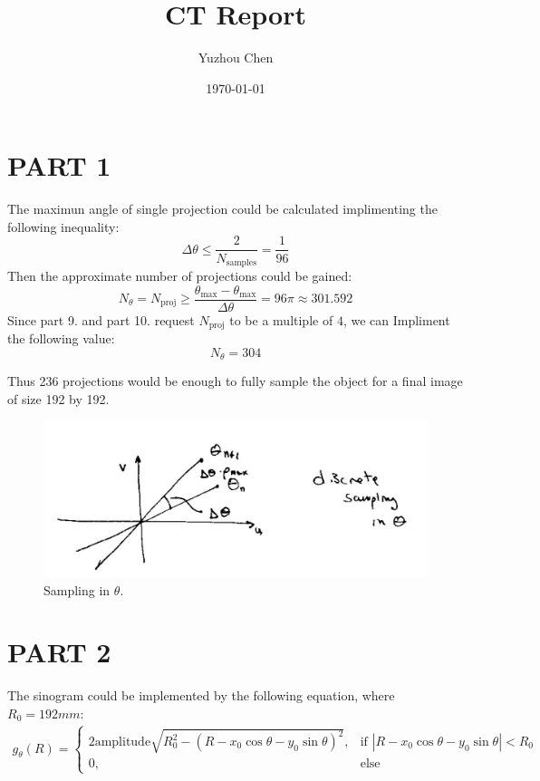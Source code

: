 \documentclass{report}
\title{CT Report}
\author{Yuzhou Chen}
\date{\today}
\begin{document}
\maketitle
\section[short]{PART 1}

The maximun angle of single projection could be calculated implimenting the following inequality:
\[
    \Delta \theta \leq \frac{2}{N_{\text{samples}}} = \frac{1}{96}
\]
Then the approximate number of projections could be gained: 
\[
    N_\theta = N_{\text{proj}} \geq \frac{\theta_{\text{max}}-\theta_{\text{max}}}{\Delta \theta} = 96 \pi \approx 301.592
\]
Since part 9. and part 10. request $ N_{\text{proj}}$ to be a multiple of $4$, we can Impliment the following value:
\[
    N_\theta = 304
\]

Thus 236 projections would be enough to fully sample the object for a final
image of size 192 by 192.
\begin{figure}[hb]
    \centering
    \includegraphics[width=1\textwidth]{1.png}
    \caption{Sampling in $\theta$.}
\end{figure}  

\newpage
\section[short]{PART 2}
The sinogram could be implemented by the following equation, where $R_0 = 192mm$:
\begin{align*}
g_{\theta}(R) = 
\begin{cases} 
2\text{amplitude}\sqrt{R_0^2 - \left( R - x_0\cos\theta - y_0\sin\theta \right)^2},
& \text{if } \left| R - x_0\cos\theta - y_0\sin\theta \right| < R_0 \\
0, & \text{else}
\end{cases}
\end{align*}
\end{document}

